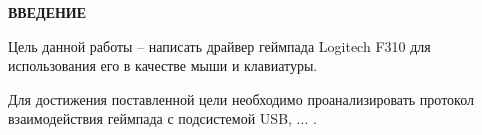 \begin{center}
    {\bfseries\Large ВВЕДЕНИЕ}
\end{center}

Цель данной работы -- написать драйвер геймпада Logitech F310 для использования его в качестве мыши и клавиатуры.

Для достижения поставленной цели необходимо проанализировать протокол взаимодействия геймпада с подсистемой USB, ... .

\pagebreak
